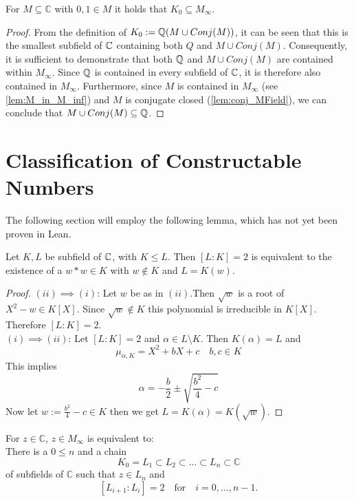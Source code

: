 \begin{lemma}
    \label{lem:K_zero_in_MField}
    \leanok
    For $M\subseteq \mathbb{C}$ with $0,1 \in M$ it holds that $K_0 \subseteq M_{\infty}$.
\end{lemma}
\begin{proof}
From the definition of $K_0 := \mathbb{Q}(M\cup Conj(M))$, 
it can be seen that this is the smallest subfield of $\mathbb{C}$ containing both $Q$ and $M\cup Conj(M)$. 
Consequently, it is sufficient to demonstrate that both $\mathbb{Q}$ and $M\cup Conj(M)$ are contained within $M_{\infty}$. 
Since $\mathbb{Q}$ is contained in every subfield of $\mathbb{C}$, it is therefore also contained in $M_{\infty}$. 
Furthermore, since $M$ is contained in $M_{\infty}$ (see \ref{lem:M_in_M_inf}) and $M$ is conjugate closed (\ref{lem:conj_MField}), we can conclude that $M\cup Conj(M) \subseteq \mathbb{Q}$.
\end{proof}

\section{Classification of Constructable Numbers}
The following section will employ the following lemma, which has not yet been proven in Lean.

\begin{lemma}
    \label{lem:dergree_two_eq_sqr}
    Let $K, L$ be subfield of $\mathbb{C}$, with $K\le L$. Then $[L:K] = 2$ is equivalent to the existence of a $w*w \in K$ with $w \notin K$ and $L = K(w)$.
\end{lemma}
\begin{proof}
    $(ii)\implies (i)$: Let $w$ be as in $(ii)$.Then $\sqrt{w}$ is a root of $X^2 - w \in K[X]$. Since $\sqrt{w} \notin K$ this polynomial is irreducible in $K[X]$. Therefore $[L:K] = 2$.\\
    $(i)\implies (ii)$: Let $[L:K] = 2$ and $\alpha \in L \setminus K$. Then $K(\alpha) = L$ and 
    $$\mu_{\alpha, K}=X^2 + bX + c \quad b,c \in K$$
    This implies 
    $$\alpha = -\frac{b}{2} \pm \sqrt{\frac{b^2}{4} - c} $$
    Now let $w := \frac{b^2}{4} - c \in K$ then we get $L = K(\alpha) = K(\sqrt{w})$.
\end{proof}

\begin{theorem}
    \label{thm:Classfication_z_in_M_inf}
    For $z \in \mathbb{C}$, $z \in M_{\infty}$ is equivalent to:\\
    There is a $0\le n$ and a chain 
    $$K_0 = L_1 \subset L_2 \subset \ldots \subset L_n \subset \mathbb{C}$$
    of subfields of $\mathbb{C}$ such that $z \in L_n$ and 
    $$ [L_{i+1}:L_i] = 2 \quad \text{for} \quad i = 0, \ldots, n-1.$$
\end{theorem}

